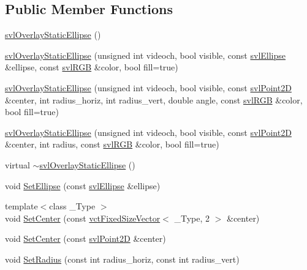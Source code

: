 \subsection*{Public Member Functions}
\begin{DoxyCompactItemize}
\item 
\hyperlink{classsvl_overlay_static_ellipse_a884b98b6b03bed60790af58c68f0c363}{svl\-Overlay\-Static\-Ellipse} ()
\item 
\hyperlink{classsvl_overlay_static_ellipse_a9afdc5b5a1f0400099a659660926aef5}{svl\-Overlay\-Static\-Ellipse} (unsigned int videoch, bool visible, const \hyperlink{structsvl_ellipse}{svl\-Ellipse} \&ellipse, const \hyperlink{structsvl_r_g_b}{svl\-R\-G\-B} \&color, bool fill=true)
\item 
\hyperlink{classsvl_overlay_static_ellipse_a5b282488e36c1dc6d9d140e0770150c5}{svl\-Overlay\-Static\-Ellipse} (unsigned int videoch, bool visible, const \hyperlink{structsvl_point2_d}{svl\-Point2\-D} \&center, int radius\-\_\-horiz, int radius\-\_\-vert, double angle, const \hyperlink{structsvl_r_g_b}{svl\-R\-G\-B} \&color, bool fill=true)
\item 
\hyperlink{classsvl_overlay_static_ellipse_aa53ae4f6a5c98ddcf8b463ef5b89b2d1}{svl\-Overlay\-Static\-Ellipse} (unsigned int videoch, bool visible, const \hyperlink{structsvl_point2_d}{svl\-Point2\-D} \&center, int radius, const \hyperlink{structsvl_r_g_b}{svl\-R\-G\-B} \&color, bool fill=true)
\item 
virtual \hyperlink{classsvl_overlay_static_ellipse_acf12035efb076d7b7c666e775e0c34ff}{$\sim$svl\-Overlay\-Static\-Ellipse} ()
\item 
void \hyperlink{classsvl_overlay_static_ellipse_a0122c9922e2738099a3797f84195959e}{Set\-Ellipse} (const \hyperlink{structsvl_ellipse}{svl\-Ellipse} \&ellipse)
\item 
{\footnotesize template$<$class \-\_\-\-Type $>$ }\\void \hyperlink{classsvl_overlay_static_ellipse_a11ad25f81cc32c28a7dd7431fe152c2f}{Set\-Center} (const \hyperlink{classvct_fixed_size_vector}{vct\-Fixed\-Size\-Vector}$<$ \-\_\-\-Type, 2 $>$ \&center)
\item 
void \hyperlink{classsvl_overlay_static_ellipse_a27a3f68ac86f3d1ad340622e6b142dbd}{Set\-Center} (const \hyperlink{structsvl_point2_d}{svl\-Point2\-D} \&center)
\item 
void \hyperlink{classsvl_overlay_static_ellipse_a47bf7f6a2010e9ccbb83382f2555fd13}{Set\-Radius} (const int radius\-\_\-horiz, const int radius\-\_\-vert)

\end{DoxyCompactItemize}
